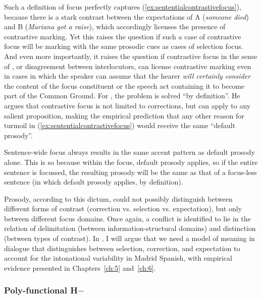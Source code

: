 Such a definition of focus perfectly captures (\ref{ex:sententialcontrastivefocus}), because there is a stark contrast between the expectations of A (\textit{someone died}) and B (\textit{Mariana got a raise}), which accordingly licenses the presence of contrastive marking. Yet this raises the question if such a case of contrastive focus will be marking with the same prosodic cues as cases of selection focus. And even more importantly, it raises the question if contrastive focus in the sense of \citet{Gabriel2007}, or disagreement between interlocutors, can license contrastive marking even in cases in which the speaker can assume that the hearer \textit{will certainly consider} the content of the focus constituent or the speech act containing it to become part of the Common Ground. For \citet[35]{Buring.2016}, the problem is solved ``by definition''. He argues that contrastive focus is not limited to corrections, but can apply to any salient proposition, making the empirical prediction that any other reason for turmoil in (\ref{ex:sententialcontrastivefocus}) would receive the same ``default prosody''.

\begin{displayquote}
Sentence-wide focus always results in the same accent pattern as default prosody alone. This is so because within the focus, default prosody applies, so if the entire sentence is focussed, the resulting prosody will be the same as that of a focus-less sentence (in which default prosody applies, by definition).\hbox{}\hfill\hbox{\citep[35]{Buring.2016}}
\end{displayquote}

Prosody, according to this dictum, could not possibly distinguish between different forms of contrast (correction vs. selection vs. expectation), but only between different focus domains. Once again, a conflict is identified to lie in the relation of delimitation (between information-structural domains) and distinction (between types of contrast). In , I will argue that we need a model of meaning in dialogue that distinguishes between selection, correction, and expectation to account for the intonational variability in Madrid Spanish, with empirical evidence presented in Chapters~\ref{ch:5} and~\ref{ch:6}. 

\subsubsection{Poly-functional H$-$}

